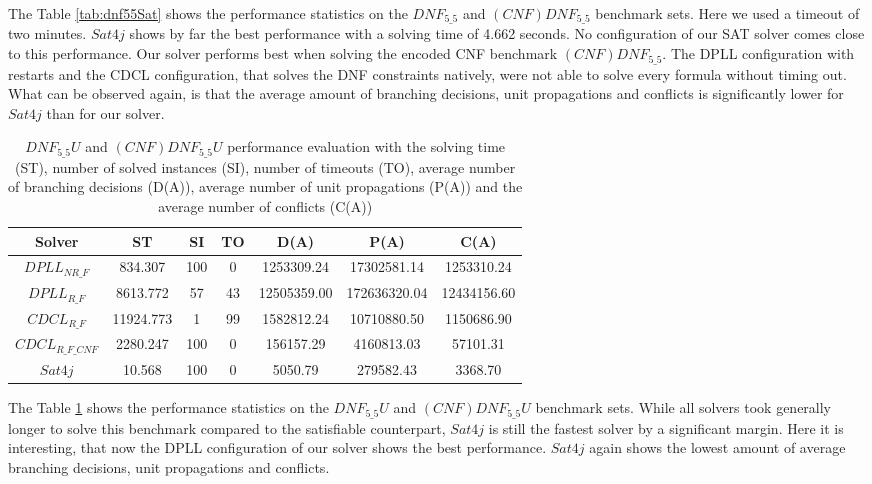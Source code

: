 The Table \ref{tab:dnf55Sat} shows the performance statistics on the $DNF_{5\_5}$ and $(CNF)DNF_{5\_5}$ benchmark sets. Here we used a timeout of two minutes. $Sat4j$ shows by far the best performance with a solving time of 4.662 seconds. No configuration of our SAT solver comes close to this performance. Our solver performs best when solving the encoded CNF benchmark $(CNF)DNF_{5\_5}$. The DPLL configuration with restarts and the CDCL configuration, that solves the DNF constraints natively, were not able to solve every formula without timing out. What can be observed again, is that the average amount of branching decisions, unit propagations and conflicts is significantly lower for $Sat4j$ than for our solver.


\begin{table}[!htb]
\centering
\caption[$DNF_{5\_5}U$ and $(CNF)DNF_{5\_5}U$ performance evaluation]{$DNF_{5\_5}U$ and $(CNF)DNF_{5\_5}U$ performance evaluation with the solving time (ST), number of solved instances (SI), number of timeouts (TO), average number of branching decisions (D(A)), average number of unit propagations (P(A)) and the average number of conflicts (C(A))}
\label{tab:dnf55Unsat}
\begin{tabular}{|c|c|c|c|c|c|c|}
\hline
Solver & ST & SI & TO & D(A) & P(A) & C(A)\\ 
\hline
$DPLL_{NR\_F}$ & 834.307 & 100 & 0 & 1253309.24 & 17302581.14 & 1253310.24 \\ 
\hline
$DPLL_{R\_F}$ & 8613.772 & 57 & 43 & 12505359.00 & 172636320.04 & 12434156.60 \\ 
\hline
$CDCL_{R\_F}$ & 11924.773 & 1 & 99 & 1582812.24 & 10710880.50 & 1150686.90 \\ 
\hline
$CDCL_{R\_F\_CNF}$ & 2280.247 & 100 & 0 & 156157.29 & 4160813.03 & 57101.31 \\ 
\hline
$Sat4j$ & 10.568 & 100 & 0 & 5050.79 & 279582.43 & 3368.70 \\ 
\hline
\end{tabular}
\end{table}

The Table \ref{tab:dnf55Unsat} shows the performance statistics on the $DNF_{5\_5}U$ and $(CNF)DNF_{5\_5}U$ benchmark sets. While all solvers took generally longer to solve this benchmark compared to the satisfiable counterpart, $Sat4j$ is still the fastest solver by a significant margin. Here it is interesting, that now the DPLL configuration of our solver shows the best performance. $Sat4j$ again shows the lowest amount of average branching decisions, unit propagations and conflicts.

